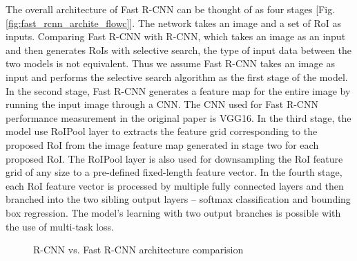 The overall architecture of Fast R-CNN can be thought of as four stages [Fig. \ref{fig:fast_rcnn_archite_flowc}]. The network takes an image and a set of RoI as inputs. Comparing Fast R-CNN with R-CNN, which takes an image as an input and then generates RoIs with selective search, the type of input data between the two models is not equivalent. Thus we assume Fast R-CNN takes an image as input and performs the selective search algorithm as the first stage of the model. In the second stage, Fast R-CNN generates a feature map for the entire image by running the input image through a CNN. The CNN used for Fast R-CNN performance measurement in the original paper is VGG16. In the third stage, the model use RoIPool layer to extracts the feature grid corresponding to the proposed RoI from the image feature map generated in stage two for each proposed RoI. The RoIPool layer is also used for downsampling the RoI feature grid of any size to a pre-defined fixed-length feature vector. In the fourth stage, each RoI feature vector is processed by multiple fully connected layers and then branched into the two sibling output layers -- softmax classification and bounding box regression. The model's learning with two output branches is possible with the use of multi-task loss.

\begin{figure}[!ht]
    \centering
    \caption{R-CNN vs. Fast R-CNN architecture comparision \cite{rcnn_vs_faster_custom_fig}} \label{fig:rcnn_vs_fast}
\end{figure}

